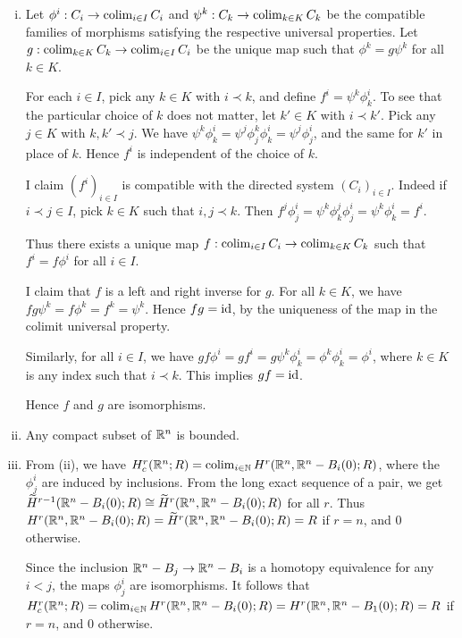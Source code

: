 \documentclass{article}
\begin{document}
 \begin{enumerate}[i.]
\item Let $\phi^i: C_i \to \operatorname{colim}_{i \in I} C_i$ and $\psi^k: C_k \to \operatorname{colim}_{k \in K} C_k$ be the compatible families of morphisms satisfying the respective universal properties. Let $g: \operatorname{colim}_{k \in K} C_k \to \operatorname{colim}_{i \in I} C_i$ be the unique map such that $\phi^k = g \psi^k$ for all $k \in K$.

For each $i \in I$, pick any $k \in K$ with $i \prec k$, and define $f^i = \psi^{k} \phi^i_{k}$. To see that the particular choice of $k$ does not matter, let $k' \in K$ with $i \prec k'$. Pick any $j \in K$ with $k, k' \prec j$.  We have $\psi^{k} \phi^i_{k} = \psi^j \phi^k_j \phi^i_k = \psi^j \phi^i_j$, and the same for $k'$ in place of $k$. Hence $f^i$ is independent of the choice of $k$.

I claim $(f^i)_{i\in I}$ is compatible with the directed system $(C_i)_{i \in I}$. Indeed if $i \prec j \in I$, pick $k \in K$ such that $i,j \prec k$. Then  $f^j \phi^i_j = \psi^k \phi^j_k \phi^i_j = \psi^k \phi^i_k = f^i$.

Thus there exists a unique map $f: \operatorname{colim}_{i \in I} C_i \to \operatorname{colim}_{k \in K} C_k$ such that $f^i = f \phi^i$ for all $i \in I$.

I claim that $f$ is a left and right inverse for $g$.  For all $k \in K$, we have $fg \psi^k = f \phi^k = f^k = \psi^k$. Hence $fg = \operatorname{id}$, by the uniqueness of the map in the colimit universal property.  

Similarly, for all $i \in I$, we have $gf \phi^i = g f^i = g \psi^k \phi^i_k = \phi^k \phi^i_k = \phi^i$, where $k \in K$ is any index such that $i \prec k$. This implies $gf = \operatorname{id}$.  

Hence $f$ and $g$ are isomorphisms.

\item Any compact subset of $\mathbb{R}^n$ is bounded.

\item From (ii), we have $H^r_c(\mathbb{R}^n; R) = \operatorname{colim}_{i \in \mathbb{N}} H^r(\mathbb{R}^n, \mathbb{R}^n - B_i(0); R)$, where the $\phi^i_j$ are induced by inclusions. From the long exact sequence of a pair, we get $\widetilde H^{r-1}(\mathbb{R}^n - B_i(0); R) \cong \widetilde H^r(\mathbb{R}^n, \mathbb{R}^n - B_i(0); R)$ for all $r$.  Thus $H^r(\mathbb{R}^n, \mathbb{R}^n - B_i(0); R) = \widetilde  H^r(\mathbb{R}^n, \mathbb{R}^n - B_i(0); R) = R$ if $r = n$, and $0$ otherwise.

Since the inclusion $\mathbb{R}^n - B_j \to \mathbb{R}^n - B_i$ is a homotopy equivalence for any $i < j$, the maps $\phi^i_j$ are isomorphisms. It follows that $H^r_c(\mathbb{R}^n; R) = \operatorname{colim}_{i \in \mathbb{N}} H^r(\mathbb{R}^n, \mathbb{R}^n - B_i(0); R) = H^r(\mathbb{R}^n, \mathbb{R}^n - B_1(0); R) = R$ if $r = n$, and $0$ otherwise.
\end{enumerate}
\end{document}
